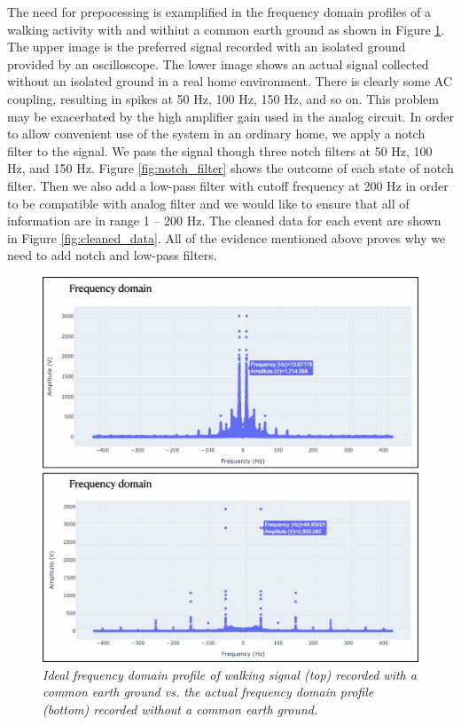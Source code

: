 The need for prepocessing is examplified in the frequency domain profiles of a walking activity with and withiut a common earth ground as shown in Figure \ref{fig:fft_raw_data}. The upper image is the preferred signal recorded with an isolated ground provided by an oscilloscope. The lower image shows an actual signal collected without an isolated ground in a real home environment. There is clearly some AC coupling, resulting in spikes at 50 Hz, 100 Hz, 150 Hz, and so on. This problem may be exacerbated by the high amplifier gain used in the analog circuit. In order to allow convenient use of the system in an ordinary home, we apply a notch filter to the signal. We pass the signal though three notch filters at 50 Hz, 100 Hz, and 150 Hz. Figure \ref{fig:notch_filter} shows the outcome of each state of notch filter. Then we also add a low-pass filter with cutoff frequency at 200 Hz in order to be compatible with analog filter and we would like to ensure that all of information are in range 1 -- 200 Hz. The cleaned data for each event are shown in Figure \ref{fig:cleaned_data}. All of the evidence mentioned above proves why we need to add notch and low-pass filters.


\begin{figure}[H]
  \centering
  \caption[Ideal frequency domain profile of walking signal.]{\emph{Ideal frequency domain profile of walking signal (top) recorded with a common earth ground vs. the actual frequency domain profile (bottom) recorded without a common earth ground.}} \label{fig:fft_raw_data}
  \includegraphics[scale = 0.22]{figures/fft_raw_data.jpg}
\end{figure}

